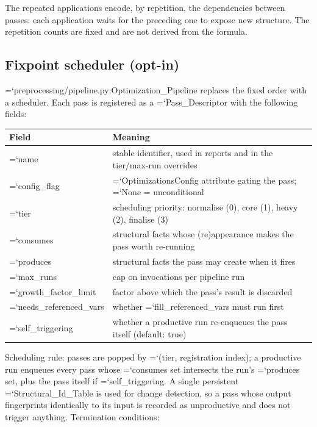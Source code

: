 \documentclass[10pt,a4paper]{article}
\newcommand{\code}[1]{{\small\ttfamily\hyphenchar\font=`\-\relax #1}}
\begin{document}
The repeated applications encode, by repetition, the dependencies between passes: each application
waits for the preceding one to expose new structure.  The repetition counts are fixed and are not
derived from the formula.

\subsection{Fixpoint scheduler (opt-in)}

\code{preprocessing/pipeline.py:\allowbreak Optimization\_\allowbreak Pipeline} replaces the fixed order with a scheduler.
Each pass is registered as a \code{Pass\_Descriptor} with the following fields:

\begin{center}
\footnotesize
\begin{tabular}{lp{104mm}}
\toprule
Field & Meaning \\
\midrule
\code{name}                & stable identifier, used in reports and in the tier/max-run overrides \\
\code{config\_flag}        & \code{OptimizationsConfig} attribute gating the pass; \code{None} = unconditional \\
\code{tier}                & scheduling priority: normalise (0), core (1), heavy (2), finalise (3) \\
\code{consumes}            & structural facts whose (re)appearance makes the pass worth re-running \\
\code{produces}            & structural facts the pass may create when it fires \\
\code{max\_runs}           & cap on invocations per pipeline run \\
\code{growth\_factor\_limit} & factor above which the pass's result is discarded \\
\code{needs\_referenced\_vars} & whether \code{fill\_referenced\_vars} must run first \\
\code{self\_triggering}    & whether a productive run re-enqueues the pass itself (default: true) \\
\bottomrule
\end{tabular}
\end{center}

Scheduling rule: passes are popped by \code{(tier, registration index)}; a productive run enqueues
every pass whose \code{consumes} set intersects the run's \code{produces} set, plus the pass itself if
\code{self\_triggering}.  A single persistent \code{Structural\_Id\_Table} is used for change detection,
so a pass whose output fingerprints identically to its input is recorded as unproductive and does not
trigger anything.  Termination conditions:
\end{document}

